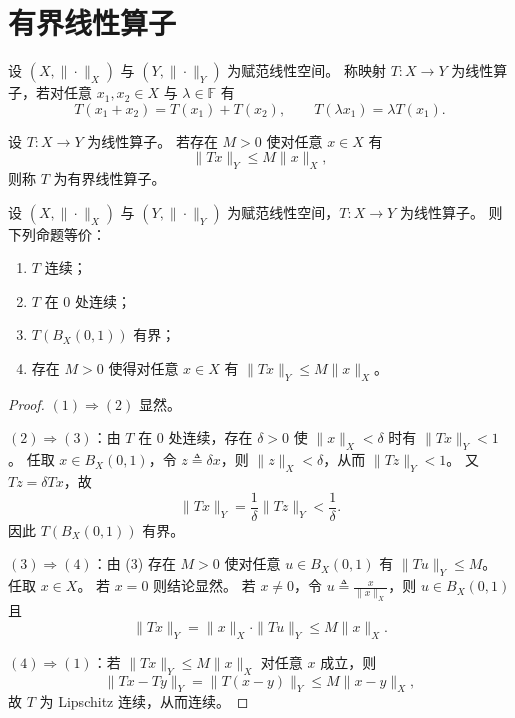 \documentclass[lang=cn,a4paper,newtx,section]{elegantbook}
\begin{document}
\section{有界线性算子}

\begin{definition}
  设 $(X,\|\cdot\|_X)$ 与 $(Y,\|\cdot\|_Y)$ 为赋范线性空间。
  称映射 $T:X\to Y$ 为线性算子，若对任意 $x_1,x_2\in X$ 与 $\lambda\in\mathbb{F}$ 有
  \[
    T(x_1+x_2)=T(x_1)+T(x_2),\qquad T(\lambda x_1)=\lambda T(x_1).
  \]
\end{definition}

\begin{definition}
  设 $T:X\to Y$ 为线性算子。
  若存在 $M>0$ 使对任意 $x\in X$ 有
  \[
    \|Tx\|_Y\le M\|x\|_X,
  \]
  则称 $T$ 为有界线性算子。
\end{definition}

\begin{theorem}\label{thm:bounded-linear-operator-equivalences}
  设 $(X,\|\cdot\|_X)$ 与 $(Y,\|\cdot\|_Y)$ 为赋范线性空间，$T:X\to Y$ 为线性算子。
  则下列命题等价：
  \begin{enumerate}
    \item $T$ 连续；
    \item $T$ 在 $0$ 处连续；
    \item $T(B_X(0,1))$ 有界；
    \item 存在 $M>0$ 使得对任意 $x\in X$ 有 $\|Tx\|_Y\le M\|x\|_X$。
  \end{enumerate}
\end{theorem}

\begin{proof}
  $(1)\Rightarrow(2)$ 显然。

  $(2)\Rightarrow(3)$：由 $T$ 在 $0$ 处连续，存在 $\delta>0$ 使 $\|x\|_X<\delta$ 时有 $\|Tx\|_Y<1$。
  任取 $x\in B_X(0,1)$，令 $z\triangleq\delta x$，则 $\|z\|_X<\delta$，从而 $\|Tz\|_Y<1$。
  又 $Tz=\delta Tx$，故
  \[
    \|Tx\|_Y=\frac{1}{\delta}\|Tz\|_Y<\frac{1}{\delta}.
  \]
  因此 $T(B_X(0,1))$ 有界。

  $(3)\Rightarrow(4)$：由 (3) 存在 $M>0$ 使对任意 $u\in B_X(0,1)$ 有 $\|Tu\|_Y\le M$。
  任取 $x\in X$。
  若 $x=0$ 则结论显然。
  若 $x\ne0$，令 $u\triangleq\frac{x}{\|x\|_X}$，则 $u\in B_X(0,1)$ 且
  \[
    \|Tx\|_Y=\|x\|_X\cdot\|Tu\|_Y\le M\|x\|_X.
  \]

  $(4)\Rightarrow(1)$：若 $\|Tx\|_Y\le M\|x\|_X$ 对任意 $x$ 成立，则
  \[
    \|Tx-Ty\|_Y=\|T(x-y)\|_Y\le M\|x-y\|_X,
  \]
  故 $T$ 为 Lipschitz 连续，从而连续。
\end{proof}
\end{document}
